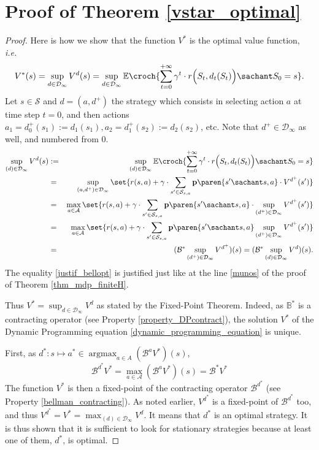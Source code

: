 \section{Proof of Theorem \ref{vstar_optimal}}
\begin{proof}
Here is how we show that the function $V^*$ is the optimal value function, 
\textit{i.e.} 
\[ V^*(s) = \sup_{d \in \mathcal{D}_{\infty}} V^d(s) =\sup_{d \in \mathcal{D}_{\infty}} \mathbb{E} \croch{\sum_{t=0}^{+ \infty} \gamma^t \cdot r\Big(S_t,d_t(S_t)\Big) \sachant S_0=s }. \]
Let $s \in \mathcal{S}$ and $d=(a,d^+)$ 
the strategy which consists in selecting action $a$ 
at time step $t=0$, 
and then actions $a_1=d^+_0(s_1):=d_1(s_1),a_2=d^+_1(s_2) := d_2(s_2)$, etc. 
Note that $d^+ \in \mathcal{D}_{\infty}$ as well,
and numbered from $0$. 
\begin{eqnarray}
\nonumber \sup_{(d) \in \mathcal{D}_{\infty}} V^d(s) & := & \sup_{(d) \in \mathcal{D}_{\infty}} \mathbb{E} \croch{\sum_{t=0}^{+ \infty} \gamma^t \cdot r\Big(S_t,d_t(S_t)\Big) \sachant S_0=s } \\
\nonumber & = & \sup_{(a,d^+) \in \mathcal{D}_{\infty}} \set{ r(s,a) + \gamma \cdot \sum_{s' \in \mathcal{S}_{s,a}} \textbf{p} \paren{s' \sachant s,a} \cdot V^{d^+}(s')} \\
\label{justif_bellopt} & = & \max_{a \in \mathcal{A}} \set{ r(s,a) + \gamma \cdot \sum_{s' \in \mathcal{S}_{s,a}} \textbf{p} \paren{s' \sachant s,a} \cdot \sup_{(d^+) \in \mathcal{D}_{\infty}} V^{d^+}(s')}  \\
\nonumber & = & \max_{a \in \mathcal{A}} \set{ r(s,a) + \gamma \cdot \sum_{s' \in \mathcal{S}_{s,a}} \textbf{p} \paren{s' \sachant s,a} \sup_{(d^+) \in \mathcal{D}_{\infty}} V^{d^+}(s')} \\
\nonumber & = & (\mathcal{B}^* \sup_{(d^+) \in \mathcal{D}_{\infty}} V^{d^+})(s) = (\mathcal{B}^* \sup_{(d) \in \mathcal{D}_{\infty}} V^{d})(s) .
\end{eqnarray}
The equality \ref{justif_bellopt} is justified
just like at the line \ref{munos} of the proof of Theorem \ref{thm_mdp_finiteH}.

Thus $V^*= \sup_{d \in \mathcal{D}_{\infty}} V^d$ 
as stated by the Fixed-Point Theorem.
Indeed, as $\mathbb{B}^*$ is a contracting operator (see Property \ref{property_DPcontract}), 
the solution $V^*$ of the Dynamic Programming equation \ref{dynamic_programming_equation} is unique. 

First, as $d^*:  s \mapsto a^* \in \operatorname*{argmax}_{a \in A}(\mathcal{B}^a V^*)(s)$,
\[ \mathcal{B}^{d^*} V^{*} = \max_{a \in \mathcal{A}} (\mathcal{B}^a V^*)(s) = \mathcal{B}^* V^*\]
The function $V^*$ is then a fixed-point of the contracting operator $\mathcal{B}^{d^*}$
(see Property \ref{bellman_contracting}).
As noted earlier, $V^{d^*}$ is a fixed-point of $\mathcal{B}^{d^*}$ too, 
and thus $V^{d^*} = V^* = \max_{(d) \in \mathcal{D}_{\infty}} V^d$. 
It means that $d^*$ is an optimal strategy.
It is thus shown that
it is sufficient to look for 
stationary strategies
because at least one of them,
$d^*$, is optimal.
\end{proof}







